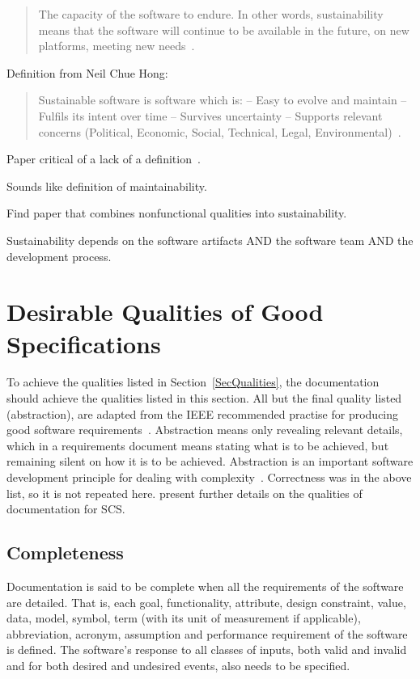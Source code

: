 \documentclass[letterpaper,cleveref]{lipics-v2019}
\begin{document}
\begin{quotation}
  \noindent The capacity of the software to endure. In other words,
  sustainability means that the software will continue to be available in the
  future, on new platforms, meeting new needs~\cite{Katz2016}.
\end{quotation}

Definition from Neil Chue Hong:
\begin{quotation}
\noindent Sustainable software is software which is:
-- Easy to evolve and maintain
-- Fulfils its intent over time
-- Survives uncertainty
-- Supports relevant concerns (Political, Economic, Social, Technical,
Legal, Environmental)~\cite{Katz2016}.
\end{quotation}

Paper critical of a lack of a definition~\cite{VentersEtAl2014}.

Sounds like definition of maintainability.

Find paper that combines nonfunctional qualities into sustainability.

Sustainability depends on the software artifacts AND the software team AND the
development process.

\section{Desirable Qualities of Good Specifications} \label{SecDesirableQs}

To achieve the qualities listed in Section~\ref{SecQualities}, the documentation
should achieve the qualities listed in this section.  All but the final quality
listed (abstraction), are adapted from the IEEE recommended practise for
producing good software requirements~\cite{IEEE1998}.  Abstraction means only
revealing relevant details, which in a requirements document means stating what
is to be achieved, but remaining silent on how it is to be achieved.
Abstraction is an important software development principle for dealing with
complexity~\cite[p.~40]{GhezziEtAl2003}.  Correctness was in the above list, so
it is not repeated here.  \citet{SmithAndKoothoor2016} present further details
on the qualities of documentation for SCS.

\subsection{Completeness}

Documentation is said to be complete when all the requirements of the software
are detailed. That is, each goal, functionality, attribute, design constraint,
value, data, model, symbol, term (with its unit of measurement if applicable),
abbreviation, acronym, assumption and performance requirement of the software is
defined.  The software's response to all classes of inputs, both valid and
invalid and for both desired and undesired events, also needs to be specified.
\end{document}
